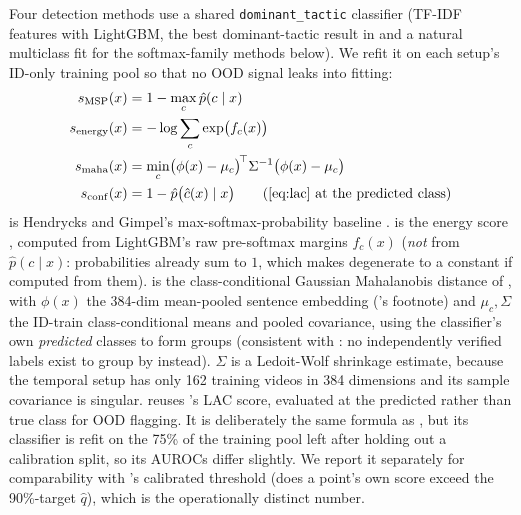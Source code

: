 \documentclass[preprint,12pt]{elsarticle}
\begin{document}
Four detection methods use a shared \texttt{dominant\_tactic} classifier
(TF-IDF features with LightGBM, the best dominant-tactic result in
 and a natural multiclass fit for the softmax-family methods
below). We refit it on each setup's ID-only training pool so that no OOD signal
leaks into fitting:
\begin{align}
  s_{\mathrm{MSP}}(x) &= 1 - \max_c \hat p(c\mid x)
    \label{eq:msp}\\
  s_{\mathrm{energy}}(x) &= -\log\sum_c \exp\bigl(f_c(x)\bigr)
    \label{eq:energy}\\
  s_{\mathrm{maha}}(x) &= \min_c \bigl(\phi(x)-\mu_c\bigr)^{\!\top} \Sigma^{-1} \bigl(\phi(x)-\mu_c\bigr)
    \label{eq:maha}\\
  s_{\mathrm{conf}}(x) &= 1 - \hat p\bigl(\hat c(x) \mid x\bigr) \qquad\text{(\Cref{eq:lac} at the predicted class)}
    \label{eq:conf-ood}
\end{align}
 is Hendrycks and Gimpel's max-softmax-probability baseline
\citep{hendrycks2017baseline}.  is the energy score
\citep{liu2020energy}, computed from LightGBM's raw pre-softmax margins
$f_c(x)$ (\emph{not} from $\hat p(c\mid x)$: probabilities already sum to
$1$, which makes  degenerate to a constant if computed
from them).  is the class-conditional
Gaussian Mahalanobis distance of \citet{lee2018simple}, with $\phi(x)$ the
384-dim mean-pooled sentence embedding ('s footnote)
and $\mu_c,\Sigma$ the ID-train class-conditional means and pooled
covariance, using the classifier's own \emph{predicted} classes to form
groups (consistent with : no independently verified
labels exist to group by instead). $\Sigma$ is a Ledoit-Wolf shrinkage
estimate, because the temporal setup has only 162 training videos in 384
dimensions and its sample covariance is singular.  reuses
's LAC score, evaluated at the predicted rather than true
class for OOD flagging. It is deliberately the same formula as ,
but its classifier is refit on the 75\% of the training pool left after
holding out a calibration split, so its AUROCs differ slightly. We report it
separately for comparability with 's calibrated threshold (does
a point's own score exceed the 90\%-target $\hat q$), which is the
operationally distinct number.
\end{document}
